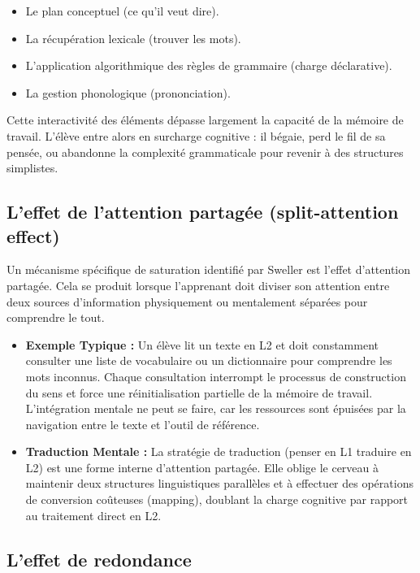 \begin{itemize}\item Le plan conceptuel (ce qu'il veut dire).\item La récupération lexicale (trouver les mots).\item L'application algorithmique des règles de grammaire (charge déclarative).\item La gestion phonologique (prononciation).\end{itemize}Cette \og interactivité des éléments\fg{} dépasse largement la capacité de la mémoire de
travail.\cite{II-2-2-ref25} L'élève entre alors en surcharge cognitive : il bégaie, perd le fil de
sa pensée, ou abandonne la complexité grammaticale pour revenir à des structures simplistes.



\subsection{L'effet de l'attention partagée (split-attention effect)}

Un mécanisme spécifique de saturation identifié par Sweller est l'effet d'attention partagée. Cela
se produit lorsque l'apprenant doit diviser son attention entre deux sources d'information
physiquement ou mentalement séparées pour comprendre le tout.\cite{II-2-2-ref26}

\begin{itemize}\item \textbf{Exemple Typique :} Un élève lit un texte en L2 et doit constamment consulter une liste de vocabulaire ou un dictionnaire pour comprendre les mots inconnus. Chaque consultation interrompt le processus de construction du sens et force une réinitialisation partielle de la mémoire de travail. L'intégration mentale ne peut se faire, car les ressources sont épuisées par la navigation entre le texte et l'outil de référence.\cite{II-2-2-ref29}\item \textbf{Traduction Mentale :} La stratégie de traduction (penser en L1 \-\> traduire en L2) est une forme interne d'attention partagée. Elle oblige le cerveau à maintenir deux structures linguistiques parallèles et à effectuer des opérations de conversion coûteuses (mapping), doublant la charge cognitive par rapport au traitement direct en L2.\cite{II-2-2-ref30}\end{itemize}

\subsection{L'effet de redondance}

